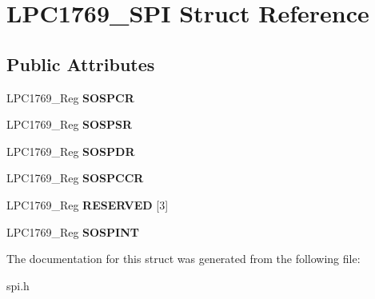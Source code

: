 \hypertarget{struct_l_p_c1769___s_p_i}{\section{L\+P\+C1769\+\_\+\+S\+P\+I Struct Reference}
\label{struct_l_p_c1769___s_p_i}
}
\subsection*{Public Attributes}
\begin{DoxyCompactItemize}
\item 
\hypertarget{struct_l_p_c1769___s_p_i_a85e0a76193de6acefdd59c7e12fea01b}{L\+P\+C1769\+\_\+\+Reg {\bfseries S\+O\+S\+P\+C\+R}}\label{struct_l_p_c1769___s_p_i_a85e0a76193de6acefdd59c7e12fea01b}

\item 
\hypertarget{struct_l_p_c1769___s_p_i_a78e83e4f4b3a802d7d8e8bdb0084e34e}{L\+P\+C1769\+\_\+\+Reg {\bfseries S\+O\+S\+P\+S\+R}}\label{struct_l_p_c1769___s_p_i_a78e83e4f4b3a802d7d8e8bdb0084e34e}

\item 
\hypertarget{struct_l_p_c1769___s_p_i_a0968da56c14882a210209f991786e234}{L\+P\+C1769\+\_\+\+Reg {\bfseries S\+O\+S\+P\+D\+R}}\label{struct_l_p_c1769___s_p_i_a0968da56c14882a210209f991786e234}

\item 
\hypertarget{struct_l_p_c1769___s_p_i_a493faa0849f1faf61acda5d564e7d5e3}{L\+P\+C1769\+\_\+\+Reg {\bfseries S\+O\+S\+P\+C\+C\+R}}\label{struct_l_p_c1769___s_p_i_a493faa0849f1faf61acda5d564e7d5e3}

\item 
\hypertarget{struct_l_p_c1769___s_p_i_a39c2089a674b039099164d83c639d9be}{L\+P\+C1769\+\_\+\+Reg {\bfseries R\+E\+S\+E\+R\+V\+E\+D} \mbox{[}3\mbox{]}}\label{struct_l_p_c1769___s_p_i_a39c2089a674b039099164d83c639d9be}

\item 
\hypertarget{struct_l_p_c1769___s_p_i_a76ff4fbae813b8651d23a15206d994f3}{L\+P\+C1769\+\_\+\+Reg {\bfseries S\+O\+S\+P\+I\+N\+T}}\label{struct_l_p_c1769___s_p_i_a76ff4fbae813b8651d23a15206d994f3}

\end{DoxyCompactItemize}


The documentation for this struct was generated from the following file\+:\begin{DoxyCompactItemize}
\item 
spi.\+h\end{DoxyCompactItemize}
